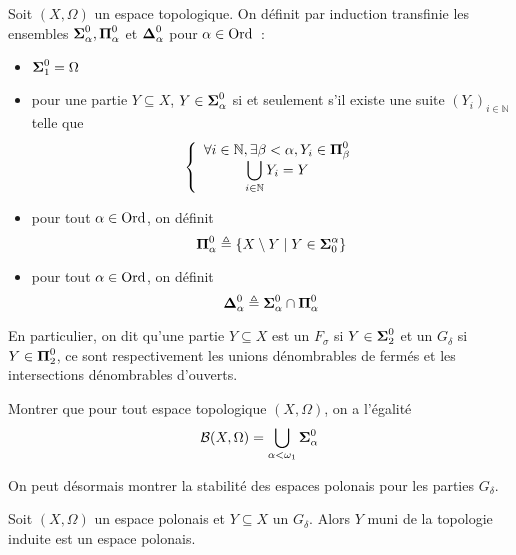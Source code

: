 \begin{definition}
  Soit $(X,\Omega)$ un espace topologique. On définit par induction transfinie
  les ensembles $\boldsymbol{\Sigma}^0_\alpha,\boldsymbol{\Pi}^0_\alpha$ et $\boldsymbol{\Delta}^0_\alpha$ pour
  $\alpha \in \operatorname{Ord}$~:
  \begin{itemize}
  \item $\boldsymbol{\Sigma}_1^0 = \Omega$
  \item pour une partie $Y\subseteq X$, $Y\in\boldsymbol{\Sigma}_\alpha^0$ si et seulement
    s'il existe une suite $(Y_i)_{i\in\mathbb N}$ telle que
    \[\left\{\begin{array}{c}
    \forall i \in \mathbb N, \exists \beta < \alpha, Y_i \in \boldsymbol{\Pi}_\beta^0\\
    \displaystyle\bigcup_{i\in\mathbb N} Y_i = Y
    \end{array}\right.\]
  \item pour tout $\alpha \in \operatorname{Ord}$, on définit
    \[\boldsymbol{\Pi}_\alpha^0 \triangleq \{X\setminus Y\mid Y \in \boldsymbol{\Sigma}_0^\alpha\}\]
  \item pour tout $\alpha \in \operatorname{Ord}$, on définit
    \[\boldsymbol{\Delta}_\alpha^0\triangleq \boldsymbol{\Sigma}_\alpha^0\cap \boldsymbol{\Pi}_\alpha^0\]
  \end{itemize}

  En particulier, on dit qu'une partie $Y\subseteq X$ est un $F_\sigma$ si
  $Y\in\boldsymbol{\Sigma}_2^0$ et un $G_\delta$ si $Y\in\boldsymbol{\Pi}_2^0$, ce sont respectivement les
  unions dénombrables de fermés et les intersections dénombrables d'ouverts.
\end{definition}

\begin{exercise}
  Montrer que pour tout espace topologique $(X,\Omega)$, on a l'égalité
  \[\mathcal{B}(X,\Omega) = \bigcup_{\alpha < \omega_1} \boldsymbol{\Sigma}_\alpha^0\]
\end{exercise}

On peut désormais montrer la stabilité des espaces polonais pour les parties
$G_\delta$.

\begin{proposition}
  Soit $(X,\Omega)$ un espace polonais et $Y\subseteq X$ un $G_\delta$. Alors
  $Y$ muni de la topologie induite est un espace polonais.
\end{proposition}

